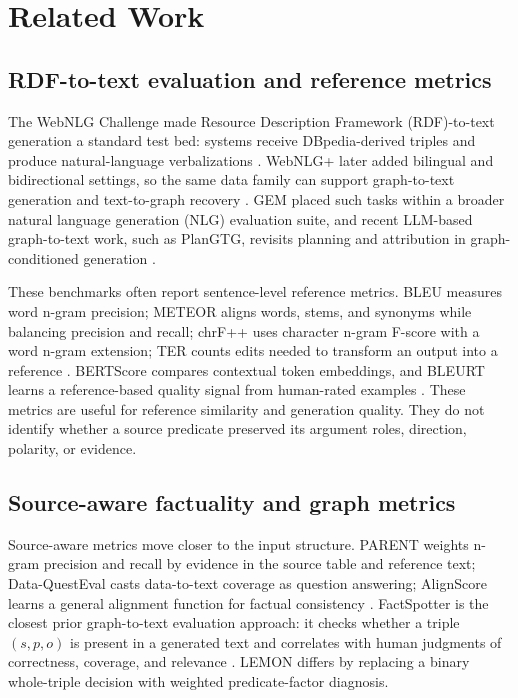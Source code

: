 \section{Related Work}
\subsection{RDF-to-text evaluation and reference metrics}
The WebNLG Challenge made Resource Description Framework (RDF)-to-text generation a standard test bed: systems receive DBpedia-derived triples and produce natural-language verbalizations \cite{gardent2017webnlg}. WebNLG+ later added bilingual and bidirectional settings, so the same data family can support graph-to-text generation and text-to-graph recovery \cite{castroferreira2020webnlg}. GEM placed such tasks within a broader natural language generation (NLG) evaluation suite, and recent LLM-based graph-to-text work, such as PlanGTG, revisits planning and attribution in graph-conditioned generation \cite{gehrmann2021gem,he2025plangtg}.

These benchmarks often report sentence-level reference metrics. BLEU measures word n-gram precision; METEOR aligns words, stems, and synonyms while balancing precision and recall; chrF++ uses character n-gram F-score with a word n-gram extension; TER counts edits needed to transform an output into a reference \cite{papineni2002bleu,banerjee2005meteor,popovic2017chrf,snover2006ter}. BERTScore compares contextual token embeddings, and BLEURT learns a reference-based quality signal from human-rated examples \cite{zhang2020bertscore,sellam2020bleurt}. These metrics are useful for reference similarity and generation quality. They do not identify whether a source predicate preserved its argument roles, direction, polarity, or evidence.

\subsection{Source-aware factuality and graph metrics}
Source-aware metrics move closer to the input structure. PARENT weights n-gram precision and recall by evidence in the source table and reference text; Data-QuestEval casts data-to-text coverage as question answering; AlignScore learns a general alignment function for factual consistency \cite{dhingra2019parent,rebuffel2021dataquesteval,zha2023alignscore}. FactSpotter is the closest prior graph-to-text evaluation approach: it checks whether a triple \((s,p,o)\) is present in a generated text and correlates with human judgments of correctness, coverage, and relevance \cite{zhang2023factspotter}. LEMON differs by replacing a binary whole-triple decision with weighted predicate-factor diagnosis.

